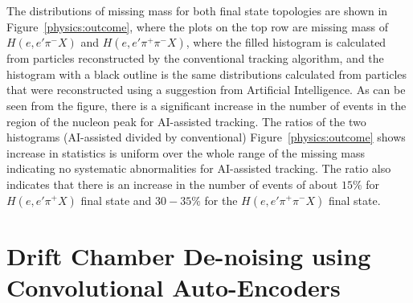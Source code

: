 \documentclass{webofc}
\begin{document}
The distributions of missing mass for both final state topologies are shown in Figure~\ref{physics:outcome}, where the plots 
on the top row are missing mass of $H(e,e'\pi^-X)$ and $H(e,e'\pi^+\pi^-X)$, where the filled histogram is calculated from 
particles reconstructed by the conventional tracking algorithm, and the histogram with a black outline is the same distributions 
calculated from particles that were reconstructed using a suggestion from Artificial Intelligence. As can be seen from the figure, 
there is a significant increase in the number of events in the region of the nucleon peak for AI-assisted
tracking. The ratios of the two histograms (AI-assisted divided by conventional)
Figure~\ref{physics:outcome} shows increase in statistics is uniform over the whole range of the 
missing mass indicating no systematic abnormalities for AI-assisted tracking. The ratio also indicates that there is an increase 
in the number of events of about $15\%$ for $H(e,e'\pi^+X)$ final state and $30-35\%$ for the $H(e,e'\pi^+\pi^-X)$
final state. 

\section{Drift Chamber De-noising using Convolutional Auto-Encoders}
\label{dc-denoising}
\end{document}
